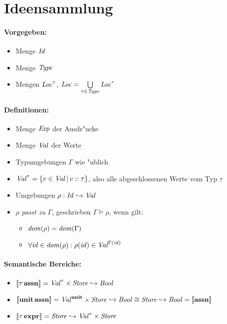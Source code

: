 \documentclass[12pt,a4paper,bigheadings]{scrartcl}
\newcommand{\semantic}[1]{\ensuremath{\llbracket#1\rrbracket}}
\newcommand{\assn}{\textbf{assn}}
\newcommand{\expr}{\textbf{expr}}
\begin{document}
\section*{Ideensammlung}

\paragraph*{Vorgegeben:}
\begin{itemize}
  \item Menge ${\text{\it Id\/}}$
  \item Menge ${\text{\it Type\/}}$
  \item Mengen ${\text{\it Loc\/}}^\tau$, ${\text{\it Loc\/}} = \bigcup\limits_{\tau\in{\text{\it Type\/}}} {\text{\it Loc\/}}^\tau$
\end{itemize}

\paragraph*{Definitionen:}
\begin{itemize}
  \item Menge ${\text{\it Exp\/}}$ der Ausdr"ucke
  \item Menge ${\text{\it Val\/}}$ der Werte
  \item Typumgebungen $\Gamma$ wie "ublich
  \item ${\text{\it Val\/}}^\tau = \{v\in{\text{\it Val\/}}\,|\,v\mathrel{::}\tau\}$, also alle abgeschlossenen
        Werte vom Typ $\tau$
  \item Umgebungen $\rho: {\text{\it Id\/}} \hookrightarrow {\text{\it Val\/}}$
  \item $\rho$ {\em passt zu} $\Gamma$, geschrieben $\Gamma \models \rho$,
        wenn gilt:
        \begin{itemize}
          \item ${\text{\it dom\/}}(\rho) = {\text{\it dom\/}}(\Gamma)$
          \item $\forall {\text{\it id\/}}\in{\text{\it dom\/}}(\rho): \rho({\text{\it id\/}}) \in {\text{\it Val\/}}^{\Gamma({\text{\it id\/}})}$
        \end{itemize}
\end{itemize}

\paragraph*{Semantische Bereiche:}
\begin{itemize}
  \item $\semantic{\tau\,\assn} = \Val^\tau \times \Store \pto \Bool$
  \item $\semantic{\unit\,\assn} = \Val^\unit \times \Store \pto \Bool \cong \Store \pto \Bool = \semantic{\assn}$
  \item $\semantic{\tau\,\expr} = \Store \pto \Val^\tau \times \Store$
\end{itemize}
\end{document}
